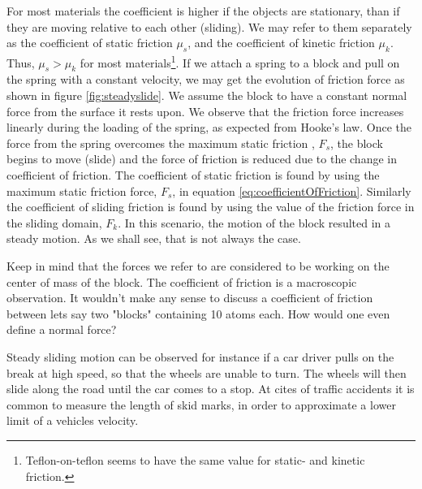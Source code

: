 \documentclass[twoside,english]{uiofysmaster}
\begin{document}
For most materials the coefficient is higher if the objects are stationary, than if they are moving relative to each other (sliding).
We may refer to them separately as the coefficient of static friction $\mu_s$, and the coefficient of kinetic friction $\mu_k$.
Thus, $\mu_s>\mu_ k$ for most materials\footnote{Teflon-on-teflon seems to have the same value for static- and kinetic friction.}.
If we attach a spring to a block and pull on the spring with a constant velocity, we may get the evolution of friction force as shown in figure \ref{fig:steadyslide}.
We assume the block to have a constant normal force from the surface it rests upon. 
We observe that the friction force increases linearly during the loading of the spring, as expected from Hooke's law. 
Once the force from the spring overcomes the maximum static friction , $F_s$, the block begins to move (slide) and the force of friction is reduced due to the change in coefficient of friction. 
The coefficient of static friction is found by using the maximum static friction force, $F_s$, in equation \eqref{eq:coefficientOfFriction}. 
Similarly the coefficient of sliding friction is found by using the value of the friction force in the sliding domain, $F_k$.
In this scenario, the motion of the block resulted in a steady motion. 
As we shall see, that is not always the case.

Keep in mind that the forces we refer to are considered to be working on the center of mass of the block. 
The coefficient of friction is a macroscopic observation.
It wouldn't make any sense to discuss a coefficient of friction between lets say two "blocks" containing 10 atoms each.
How would one even define a normal force? 

Steady sliding motion can be observed for instance if a car driver pulls on the break at high speed, so that the wheels are unable to turn.
The wheels will then slide along the road until the car comes to a stop. 
At cites of traffic accidents it is common to measure the length of skid marks, in order to approximate a lower limit of a vehicles velocity. 
\end{document}
